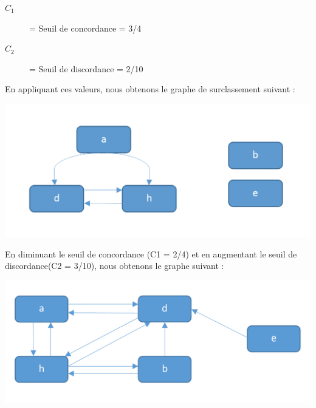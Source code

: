 \documentclass[12pt]{article}
\begin{document}
\begin{description}
\item[$C_{1}$] = Seuil de concordance = 3/4
\item[$C_{2}$] = Seuil de discordance = 2/10
\end{description}
En appliquant ces valeurs, nous obtenons le graphe de surclassement suivant : 
\begin{center}
\includegraphics[scale=1.5]{graphes/s_3sur4____v_2sur10}
\end{center}

En diminuant le seuil de concordance (C1 = 2/4) et en augmentant le seuil de discordance(C2 = 3/10), nous obtenons le graphe suivant : 
\begin{center}
\includegraphics[scale=1]{graphes/s_2sur4____v_3sur10}
\end{center}

\end{document}
